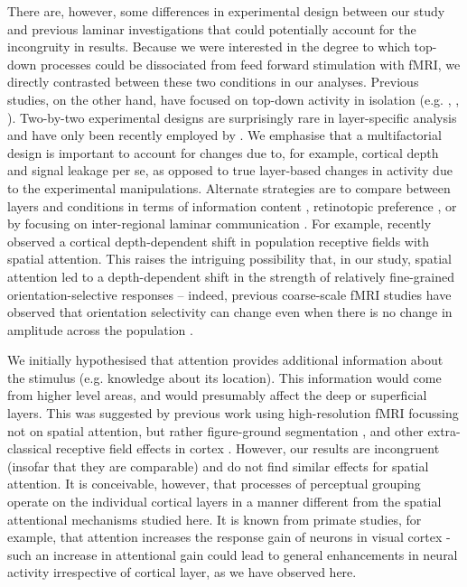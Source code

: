 \documentclass[9pt,lineno]{aperture}
\begin{document}
There are, however, some differences in experimental design between our study and previous laminar investigations that could potentially account for the incongruity in results. Because we were interested in the degree to which top-down processes could be dissociated from feed forward stimulation with fMRI, we directly contrasted between these two conditions in our analyses. Previous studies, on the other hand, have focused on top-down activity in isolation (e.g. \citet{Muckli2015}, \citet{Kok2016}, \citet{Lawrence2018}). Two-by-two experimental designs are surprisingly rare in layer-specific analysis and have only been recently employed by \citet{DeHollander2020}. We emphasise that a multifactorial design is important to account for changes due to, for example, cortical depth and signal leakage per se, as opposed to true layer-based changes in activity due to the experimental manipulations. Alternate strategies are to compare between layers and conditions in terms of information content \citep{Muckli2015}, retinotopic preference \citep{Klein2018}, or by focusing on inter-regional laminar communication \citep{Sharoh2019}. For example, \citet{Klein2018} recently observed a cortical depth-dependent shift in population receptive fields with spatial attention. This raises the intriguing possibility that, in our study, spatial attention led to a depth-dependent shift in the strength of relatively fine-grained orientation-selective responses – indeed, previous coarse-scale fMRI studies have observed that orientation selectivity can change even when there is no change in amplitude across the population \citep{Jehee2011,Jehee2012}.

We initially hypothesised that attention provides additional information about the stimulus (e.g. knowledge about its location). This information would come from higher level areas, and would presumably affect the deep or superficial layers. This was suggested by previous work using high-resolution fMRI focussing not on spatial attention, but rather figure-ground segmentation \citep{Kok2016}, and other extra-classical receptive field effects in cortex \citep{Muckli2015}. However, our results are incongruent (insofar that they are comparable) and do not find similar effects for spatial attention. It is conceivable, however, that processes of perceptual grouping operate on the individual cortical layers in a manner different from the spatial attentional mechanisms studied here. It is known from primate studies, for example, that attention increases the response gain of neurons in visual cortex \citep{Treue1999,MartinezTrujillo2004} - such an increase in attentional gain could lead to general enhancements in neural activity irrespective of cortical layer, as we have observed here.
\end{document}
